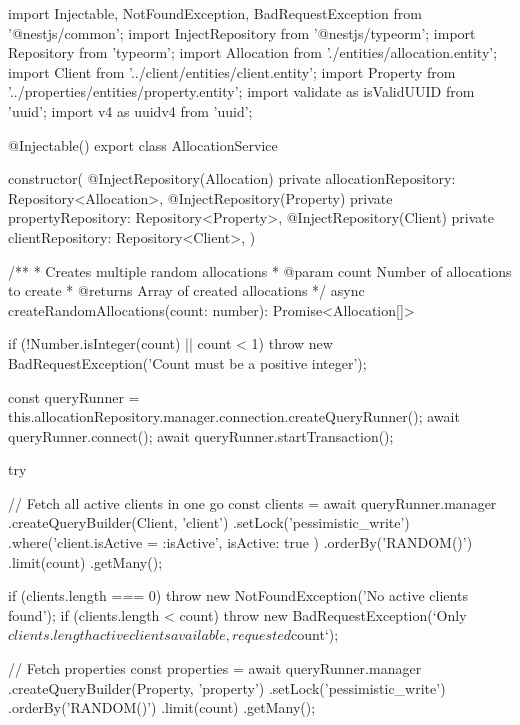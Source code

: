 
import { Injectable, NotFoundException, BadRequestException } from '@nestjs/common';
import { InjectRepository } from '@nestjs/typeorm';
import { Repository } from 'typeorm';
import { Allocation } from './entities/allocation.entity';
import { Client } from '../client/entities/client.entity';
import { Property } from '../properties/entities/property.entity';
import { validate as isValidUUID } from 'uuid';
import { v4 as uuidv4 } from 'uuid';

@Injectable()
export class AllocationService {
  constructor(
    @InjectRepository(Allocation)
    private allocationRepository: Repository<Allocation>,
    @InjectRepository(Property)
    private propertyRepository: Repository<Property>,
    @InjectRepository(Client)
    private clientRepository: Repository<Client>,
  ) {}

  /**
   * Creates multiple random allocations
   * @param count Number of allocations to create
   * @returns Array of created allocations
   */
  async createRandomAllocations(count: number): Promise<Allocation[]> {
    if (!Number.isInteger(count) || count < 1) {
      throw new BadRequestException('Count must be a positive integer');
    }

    const queryRunner = this.allocationRepository.manager.connection.createQueryRunner();
    await queryRunner.connect();
    await queryRunner.startTransaction();

    try {
      // Fetch all active clients in one go
      const clients = await queryRunner.manager
        .createQueryBuilder(Client, 'client')
        .setLock('pessimistic_write')
        .where('client.isActive = :isActive', { isActive: true })
        .orderBy('RANDOM()')
        .limit(count)
        .getMany();

      if (clients.length === 0) {
        throw new NotFoundException('No active clients found');
      }
      if (clients.length < count) {
        throw new BadRequestException(`Only ${clients.length} active clients available, requested ${count}`);
      }

      // Fetch properties
      const properties = await queryRunner.manager
        .createQueryBuilder(Property, 'property')
        .setLock('pessimistic_write')
        .orderBy('RANDOM()')
        .limit(count)
        .getMany();

}}}
